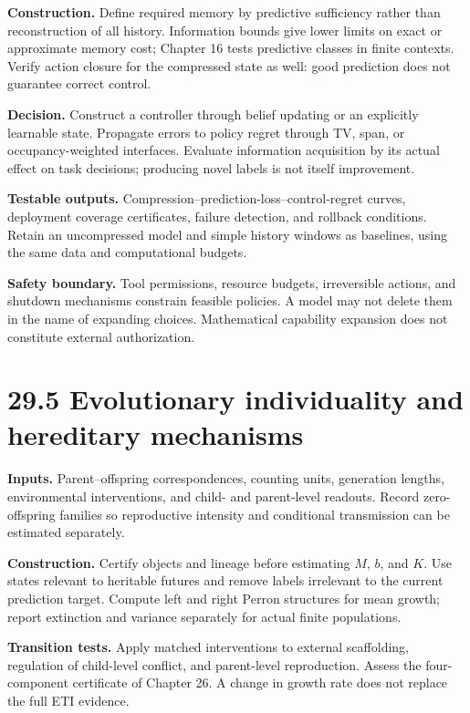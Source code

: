 \documentclass[
  english,
  11pt,
  oneside]{book}
\begin{document}
\textbf{Construction.} Define required memory by predictive sufficiency rather than reconstruction of all history. Information bounds give lower limits on exact or approximate memory cost; Chapter 16 tests predictive classes in finite contexts. Verify action closure for the compressed state as well: good prediction does not guarantee correct control.

\textbf{Decision.} Construct a controller through belief updating or an explicitly learnable state. Propagate errors to policy regret through TV, span, or occupancy-weighted interfaces. Evaluate information acquisition by its actual effect on task decisions; producing novel labels is not itself improvement.

\textbf{Testable outputs.} Compression--prediction-loss--control-regret curves, deployment coverage certificates, failure detection, and rollback conditions. Retain an uncompressed model and simple history windows as baselines, using the same data and computational budgets.

\textbf{Safety boundary.} Tool permissions, resource budgets, irreversible actions, and shutdown mechanisms constrain feasible policies. A model may not delete them in the name of expanding choices. Mathematical capability expansion does not constitute external authorization.

\section{29.5 Evolutionary individuality and hereditary mechanisms}\label{evolutionary-individuality-and-hereditary-mechanisms}

\textbf{Inputs.} Parent--offspring correspondences, counting units, generation lengths, environmental interventions, and child- and parent-level readouts. Record zero-offspring families so reproductive intensity and conditional transmission can be estimated separately.

\textbf{Construction.} Certify objects and lineage before estimating \(M\), \(b\), and \(K\). Use states relevant to heritable futures and remove labels irrelevant to the current prediction target. Compute left and right Perron structures for mean growth; report extinction and variance separately for actual finite populations.

\textbf{Transition tests.} Apply matched interventions to external scaffolding, regulation of child-level conflict, and parent-level reproduction. Assess the four-component certificate of Chapter 26. A change in growth rate does not replace the full ETI evidence.
\end{document}
